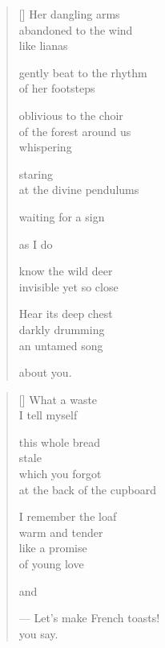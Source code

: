 \documentclass[14pt]{extbook}
\newcommand*{\centeredornament}{\centerline{\pgfornament[width=6cm]{88}}}
\begin{document}

\newpage

\vspace*{-15mm}
\centeredornament
\vspace*{-7mm}


\settowidth{\versewidth}{gently beat to the rhythm}

\begin{verse}[\versewidth]
  Her dangling arms \\
  abandoned to the wind \\
  like lianas

  gently beat to the rhythm \\
  of her footsteps

  oblivious to the choir \\
  of the forest around us \\
  whispering

  staring \\
  at the divine pendulums

  waiting for a sign

  as I do

  know the wild deer \\
  invisible yet so close

  Hear its deep chest \\
  darkly drumming \\
  an untamed song

  about you.
\end{verse}


\newpage

\vspace*{-15mm}
\centeredornament
\vspace*{-7mm}


\settowidth{\versewidth}{--- Let's make French toasts!}

\begin{verse}[\versewidth]
  What a waste \\
  I tell myself

  this whole bread \\
  stale \\
  which you forgot \\
  at the back of the cupboard

  I remember the loaf \\
  warm and tender \\
  like a promise \\
  of young love

  and

  --- Let's make French toasts! \\
  you say.
\end{verse}
\end{document}
